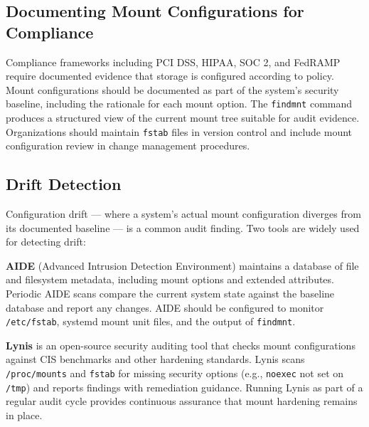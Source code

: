 \begin{securitybox}
\subsection*{Documenting Mount Configurations for Compliance}

Compliance frameworks including PCI DSS, HIPAA, SOC 2, and FedRAMP require documented evidence that storage is configured according to policy. Mount configurations should be documented as part of the system's security baseline, including the rationale for each mount option. The \texttt{findmnt} command produces a structured view of the current mount tree suitable for audit evidence. Organizations should maintain \texttt{fstab} files in version control and include mount configuration review in change management procedures.

\subsection*{Drift Detection}

Configuration drift --- where a system's actual mount configuration diverges from its documented baseline --- is a common audit finding. Two tools are widely used for detecting drift:

\textbf{AIDE} (Advanced Intrusion Detection Environment) maintains a database of file and filesystem metadata, including mount options and extended attributes. Periodic AIDE scans compare the current system state against the baseline database and report any changes. AIDE should be configured to monitor \texttt{/etc/fstab}, systemd mount unit files, and the output of \texttt{findmnt}.

\textbf{Lynis} is an open-source security auditing tool that checks mount configurations against CIS benchmarks and other hardening standards. Lynis scans \texttt{/proc/mounts} and \texttt{fstab} for missing security options (e.g., \texttt{noexec} not set on \texttt{/tmp}) and reports findings with remediation guidance. Running Lynis as part of a regular audit cycle provides continuous assurance that mount hardening remains in place.

\end{securitybox}
